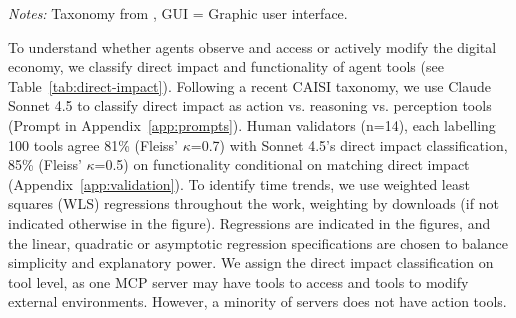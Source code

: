 \documentclass[manuscript,screen,nonacm,oneside]{acmart}
\begin{document}
\begin{table}[htbp]
\centering
\caption{Direct impact and functionality of Agent tools.}
\small
{}
\textit{Notes:} Taxonomy from \citet{CAISI2025}, GUI = Graphic user interface.
\label{tab:direct-impact}
\end{table}
To understand whether agents observe and access or actively modify the digital economy, we classify direct impact and functionality of agent tools (see Table~\ref{tab:direct-impact}). Following a recent CAISI \citep{CAISI2025} taxonomy, we use Claude Sonnet 4.5 to classify direct impact as action vs. reasoning vs. perception tools (Prompt in Appendix~\ref{app:prompts}). Human validators (n=14), each labelling 100 tools agree 81\% (Fleiss' $\kappa$=0.7) with Sonnet 4.5's direct impact classification, 85\% (Fleiss' $\kappa$=0.5) on functionality conditional on matching direct impact (Appendix~\ref{app:validation}). To identify time trends, we use weighted least squares (WLS) regressions throughout the work, weighting by downloads (if not indicated otherwise in the figure). Regressions are indicated in the figures, and the linear, quadratic or asymptotic regression specifications are chosen to balance simplicity and explanatory power. We assign the direct impact classification on tool level, as one MCP server may have tools to access and tools to modify external environments. However, a minority of servers does not have action tools.
\end{document}
